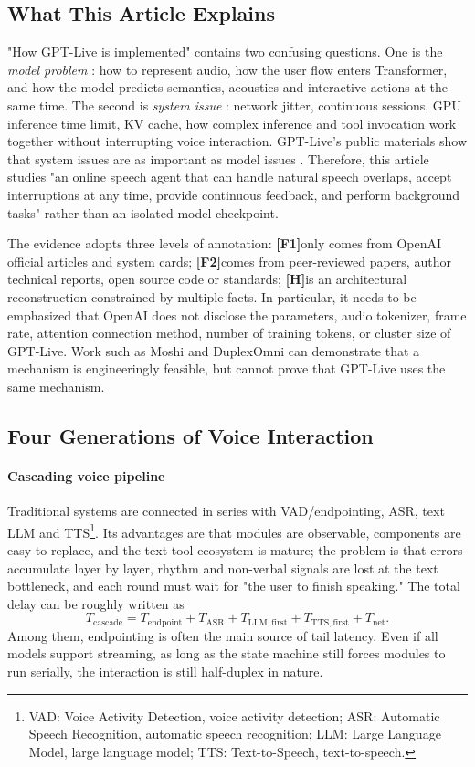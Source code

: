 \documentclass[UTF8,fontset=none,a4paper,10pt]{ctexart}
\newcommand{\FOne}{\textcolor{official}{\textbf{[F1]}}}
\newcommand{\FTwo}{\textcolor{public}{\textbf{[F2]}}}
\newcommand{\Hyp}{\textcolor{hypothesis}{\textbf{[H]}}}
\begin{document}
\subsection{What This Article Explains}

"How GPT-Live is implemented" contains two confusing questions. One is the \emph{ model problem }: how to represent audio, how the user flow enters Transformer, and how the model predicts semantics, acoustics and interactive actions at the same time. The second is \emph{ system issue }: network jitter, continuous sessions, GPU inference time limit, KV cache, how complex inference and tool invocation work together without interrupting voice interaction. GPT-Live's public materials show that system issues are as important as model issues \cite{en:openai2026gptlive,en:openai2026continuous}. Therefore, this article studies "an online speech agent that can handle natural speech overlaps, accept interruptions at any time, provide continuous feedback, and perform background tasks" rather than an isolated model checkpoint.

The evidence adopts three levels of annotation: \FOne only comes from OpenAI official articles and system cards; \FTwo comes from peer-reviewed papers, author technical reports, open source code or standards; \Hyp is an architectural reconstruction constrained by multiple facts. In particular, it needs to be emphasized that OpenAI does not disclose the parameters, audio tokenizer, frame rate, attention connection method, number of training tokens, or cluster size of GPT-Live. Work such as Moshi and DuplexOmni can demonstrate that a mechanism is engineeringly feasible, but cannot prove that GPT-Live uses the same mechanism.

\subsection{Four Generations of Voice Interaction}

\paragraph{Cascading voice pipeline}
Traditional systems are connected in series with VAD/endpointing, ASR, text LLM and TTS\footnote{VAD: Voice Activity Detection, voice activity detection; ASR: Automatic Speech Recognition, automatic speech recognition; LLM: Large Language Model, large language model; TTS: Text-to-Speech, text-to-speech. }. Its advantages are that modules are observable, components are easy to replace, and the text tool ecosystem is mature; the problem is that errors accumulate layer by layer, rhythm and non-verbal signals are lost at the text bottleneck, and each round must wait for "the user to finish speaking." The total delay can be roughly written as
\begin{equation}
T_{\mathrm{cascade}}=T_{\mathrm{endpoint}}+T_{\mathrm{ASR}}+T_{\mathrm{LLM,first}}+T_{\mathrm{TTS,first}}+T_{\mathrm{net}}.
\end{equation}
Among them, endpointing is often the main source of tail latency. Even if all models support streaming, as long as the state machine still forces modules to run serially, the interaction is still half-duplex in nature.
\end{document}
